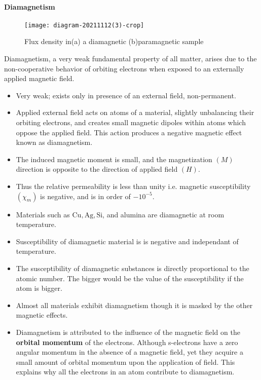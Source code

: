 \paragraph{Diamagnetism}
\begin{figure}[H]
	\centering
	\texttt{[image: diagram-20211112(3)-crop]}
	\caption{Flux density in(a) a diamagnetic (b)paramagnetic sample}
	\label{}
\end{figure}
Diamagnetism, a very weak fundamental property of all matter, arises due to the non-cooperative behavior of orbiting electrons when exposed to an externally applied magnetic field. 
\begin{itemize}
	\item  Very weak; exists only in presence of an external field, non-permanent.
	\item  Applied external field acts on atoms of a material, slightly unbalancing their orbiting electrons, and creates small magnetic dipoles within atoms which oppose the applied field. This action produces a negative magnetic effect known as diamagnetism.
	\item  The induced magnetic moment is small, and the magnetization $(M)$ direction is opposite to the direction of applied field $(H)$.
	\item  Thus the relative permeability is less than unity i.e. magnetic susceptibility $(\chi_{m})$ is negative, and is in order of $-10^{-5}$.
	\item  Materials such as $\mathrm{Cu}, \mathrm{Ag}, \mathrm{Si}$,  and alumina are diamagnetic at room temperature.
\end{itemize}
\begin{note}
	\begin{itemize}
		\item Susceptibility of diamagnetic material is is negative and independant of temperature.
		\item The susceptibility of diamagnetic substances is directly proportional to the atomic number. The bigger would be the value of the susceptibility if the atom is bigger.
		\item  Almost all materials exhibit diamagnetism though it is masked by the other magnetic effects. 
		\item Diamagnetism is attributed to the influence of the magnetic field on the \textbf{orbital momentum} of the electrons. Although s-electrons have a zero angular momentum in the absence of a magnetic field, yet they acquire a small amount of orbital momentum upon the application of field. This explains why all the electrons in an atom contribute to diamagnetism.
	\end{itemize}
\end{note}
